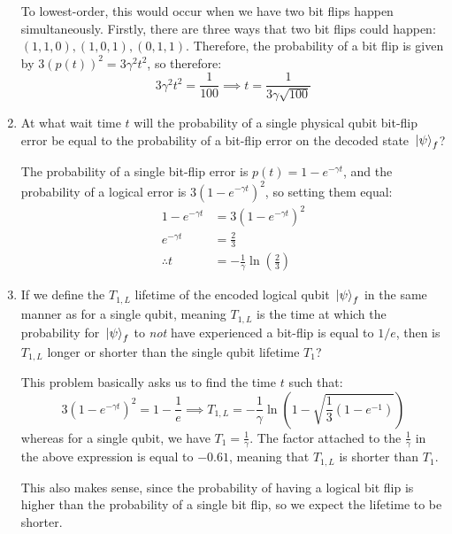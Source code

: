 \documentclass[10pt]{article}
\begin{document}
\begin{enumerate}[label=\alph*)]
			\begin{solution}
				To lowest-order, this would occur when we have two bit flips happen simultaneously. Firstly, there 
				are three ways that two bit flips could happen: \( (1, 1, 0), (1, 0, 1), (0, 1, 1) \). Therefore, 
				the probability of a bit flip is given by \( 3(p(t))^2 = 3\gamma^2 t^2\), so therefore:
				\[
				3\gamma^2 t^2 = \frac{1}{100} \implies t = \frac{1}{3 \gamma \sqrt{100}}
				\] 
			\end{solution}
		\item At what wait time \( t \) will the probability of a single physical qubit bit-flip error be equal 
			to the probability of a bit-flip error on the decoded state \( \ket*{\psi}_f \)? 

			\begin{solution}
				The probability of a single bit-flip error is \( p(t) = 1 - e^{-\gamma t} \), and the probability 
				of a logical error is \( 3(1 - e^{- \gamma t})^2 \), so setting them equal:
				\begin{align*}
					1 - e^{-\gamma t} &= 3(1 - e^{-\gamma t})^2\\
					e^{-\gamma t} &=  \frac{2}{3} \\
					\therefore t &= -\frac{1}{\gamma} \ln\left( \frac{2}{3} \right)  
				\end{align*}
			\end{solution}
		\item If we define the \( T_{1, L} \) lifetime of the encoded logical qubit \( \ket*{\psi}_f \) in the 
			same manner as for a single qubit, meaning \( T_{1, L} \) is the time at which the probability 
			for \( \ket*{\psi}_f \) to \textit{not} have experienced a bit-flip is equal to \( 1 / e \), 
			then is  \( T_{1, L} \) longer or shorter than the single qubit lifetime \( T_1 \)?

			\begin{solution}
				This problem basically asks us to find the time \( t \) such that:
				\[
				3(1 - e^{-\gamma t})^2 = 1 - \frac{1}{e} \implies T_{1, L} = -\frac{1}{\gamma}
				\ln\left( 1 - \sqrt{\frac{1}{3}(1 - e^{-1}) }\right) 
				\] 
				whereas for a single qubit, we have \( T_1 = \frac{1}{\gamma} \). The factor attached 
				to the \( \frac{1}{\gamma} \) in the above expression is equal to \( -0.61 \), meaning that 
				\( T_{1, L} \) is shorter than \( T_1 \).  

				This also makes sense, since the probability of having a logical bit flip is higher than 
				the probability of a single bit flip, so we expect the lifetime to be shorter. 
			\end{solution}
	\end{enumerate}
	\pagebreak
\end{document}

